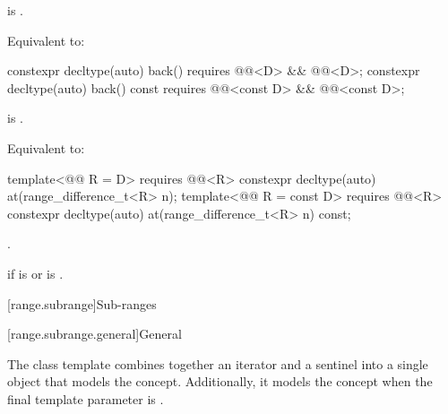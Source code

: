 \begin{itemdescr}
\pnum
\hardexpects
{} is .

\pnum
\effects
Equivalent to: 
\end{itemdescr}

%
\begin{itemdecl}
constexpr decltype(auto) back() requires @@<D> && @@<D>;
constexpr decltype(auto) back() const
  requires @@<const D> && @@<const D>;
\end{itemdecl}

\begin{itemdescr}
\pnum
\hardexpects
{} is .

\pnum
\effects
Equivalent to: 
\end{itemdescr}

%
\begin{itemdecl}
template<@@ R = D> requires @@<R>
  constexpr decltype(auto) at(range_difference_t<R> n);
template<@@ R = const D> requires @@<R>
  constexpr decltype(auto) at(range_difference_t<R> n) const;
\end{itemdecl}

\begin{itemdescr}
\pnum
\returns
{}.

\pnum
\throws
{} if  is  or
 is .
\end{itemdescr}

[range.subrange]{Sub-ranges}

[range.subrange.general]{General}

\pnum
The  class template combines together an
iterator and a sentinel into a single object that models the
 concept. Additionally, it models the
 concept when the final template parameter is
.

